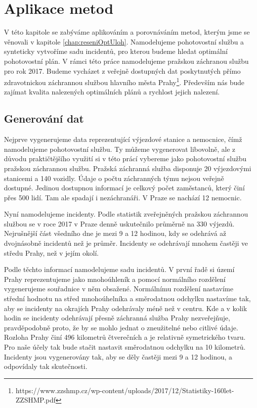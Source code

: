 \chapter{Aplikace metod}

V této kapitole se zabýváme aplikováním a porovnáváním metod, kterým jsme se věnovali v kapitole \ref{chap:reseniOptUloh}.
Namodelujeme pohotovostní službu a synteticky vytvoříme sadu incidentů, pro kterou budeme hledat optimální pohotovostní plán.
V rámci této práce namodelujeme pražskou záchranou službu pro rok 2017. Budeme vycházet z veřejně dostupných dat
poskytnutých přímo zdravotnickou záchrannou službou hlavního města Prahy\footnote{https://www.zzshmp.cz/wp-content/uploads/2017/12/Statistiky-160let-ZZSHMP.pdf}.
Především nás bude zajímat kvalita nalezených optimálních plánů a rychlost jejich nalezení.

\section{Generování dat}

Nejprve vygenerujeme data reprezentující výjezdové stanice a nemocnice, čímž namodelujeme pohotovostní službu.
Ty můžeme vygenerovat libovolně, ale z důvodu praktičtějšího využití
si v této prácí vybereme jako pohotovostní službu pražskou záchrannou službu.
Pražská záchranná služba disponuje 20 výjezdovými stanicemi a 140 vozidly.
Údaje o počtu záchranných týmu nejsou veřejně dostupné. Jedinou dostupnou informací je celkový počet zaměstanců, který činí přes 500 lidí.
Tam ale spadají i nezáchranáři.
V Praze se nachází 12 nemocnic.

Nyní namodelujeme incidenty. Podle statistik zveřejněných pražskou záchrannou službou se v roce 2017 v Praze denně uskutečnilo průměrně na 330 výjezdů.
Nejrušnější část všedního dne je mezi 9 a 12 hodinou, kdy se odehrává až dvojnásobně incidentů než je průměr.
Incidenty se odehrávají mnohem častěji ve středu Prahy, než v jejím okolí. 

Podle těchto informací namodelujeme sadu incidentů.
V první řadě si území Prahy reprezentujeme jako mnohoúhleník a pomocí normálního rozdělení vygenerujeme souřadnice v něm obsažené.
Normálnímu rozdělení nastavíme střední hodnotu na střed mnohoúhelníka a směrodatnou odchylku nastavíme tak, aby se incidenty na okrajích Prahy odehrávaly méně než v centru. 
Kde a v kolik hodin se incidenty odehrávají přesně záchranná služba Prahy nezveřejňuje, pravděpodobně proto, že by se mohlo jednat o zneužitelné nebo citlivé údaje.
Rozloha Prahy činí 496 kilometrů čtverečních a je relativně symetrického tvaru. Pro naše účely tak bude stačit nastavit směrodatnou odchylku na 10 kilometrů.
Incidenty jsou vygenerovány tak, aby se děly častěji mezi 9 a 12 hodinou, a odpovídaly tak skutečnosti.

